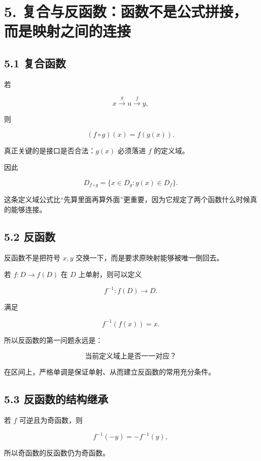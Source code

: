 \documentclass[11pt,a4paper]{ctexart}
\begin{document}
\section{5.
复合与反函数：函数不是公式拼接，而是映射之间的连接}\label{ux590dux5408ux4e0eux53cdux51fdux6570ux51fdux6570ux4e0dux662fux516cux5f0fux62fcux63a5ux800cux662fux6620ux5c04ux4e4bux95f4ux7684ux8fdeux63a5}

\subsection{5.1 复合函数}\label{ux590dux5408ux51fdux6570}

若

\[
x\xrightarrow{g}u\xrightarrow{f}y,
\]

则

\[
(f\circ g)(x)=f(g(x)).
\]

真正关键的是接口是否合法：\(g(x)\) 必须落进 \(f\) 的定义域。

因此

\[
\boxed{
D_{f\circ g}=\{x\in D_g:g(x)\in D_f\}.
}
\]

这条定义域公式比``先算里面再算外面''更重要，因为它规定了两个函数什么时候真的能够连接。

\subsection{5.2 反函数}\label{ux53cdux51fdux6570}

反函数不是把符号 \(x,y\) 交换一下，而是要求原映射能够被唯一倒回去。

若 \(f:D\to f(D)\) 在 \(D\) 上单射，则可以定义

\[
f^{-1}:f(D)\to D.
\]

满足

\[
f^{-1}(f(x))=x.
\]

所以反函数的第一问题永远是：

\[
\boxed{\text{当前定义域上是否一一对应？}}
\]

在区间上，严格单调是保证单射、从而建立反函数的常用充分条件。

\subsection{5.3
反函数的结构继承}\label{ux53cdux51fdux6570ux7684ux7ed3ux6784ux7ee7ux627f}

若 \(f\) 可逆且为奇函数，则

\[
f^{-1}(-y)=-f^{-1}(y),
\]

所以奇函数的反函数仍为奇函数。
\end{document}
